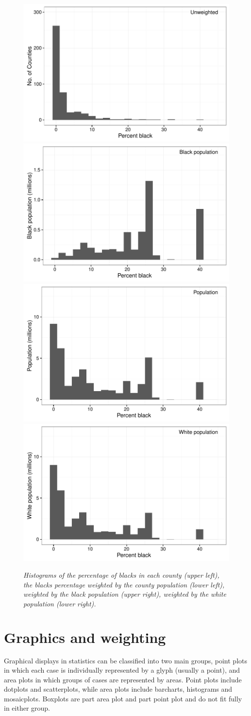 \documentclass{svmult}
\begin{document}
\begin{figure}[htbp]
  \centering
  \includegraphics[width=0.5\linewidth]{perc-black-count}%
  \includegraphics[width=0.5\linewidth]{perc-black-pop-black}
  \includegraphics[width=0.5\linewidth]{perc-black-pop}%
  \includegraphics[width=0.5\linewidth]{perc-black-pop-white}
  \caption{\em Histograms of the percentage of blacks in each county (upper left), the blacks percentage weighted by the county population (lower left), weighted by the black population (upper right), weighted by the white population (lower right).}
  \label{blackhists}
\end{figure}

\section{Graphics and weighting}
\label{gwts}
Graphical displays in statistics can be classified into two main groups, point plots in which each case is individually represented by a glyph (usually a point), and area plots in which groups of cases are represented by areas.  Point plots include dotplots and scatterplots, while area plots include barcharts, histograms and mosaicplots.  Boxplots are part area plot and part point plot and do not fit fully in either group.
\end{document}
